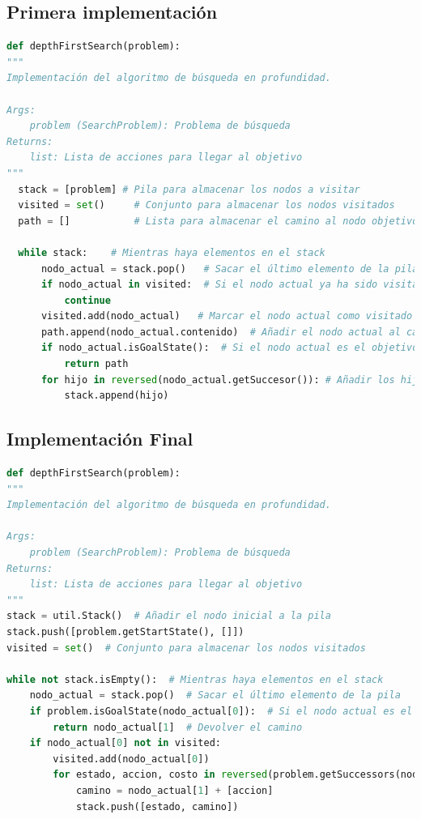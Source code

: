 \documentclass{report}
\begin{document}
        \subsection*{Primera implementación}
          \begin{lstlisting}[language=Python, caption=Implementación final del DFS]
def depthFirstSearch(problem):
"""
Implementación del algoritmo de búsqueda en profundidad.

Args:
    problem (SearchProblem): Problema de búsqueda
Returns:
    list: Lista de acciones para llegar al objetivo
"""
  stack = [problem] # Pila para almacenar los nodos a visitar
  visited = set()     # Conjunto para almacenar los nodos visitados
  path = []           # Lista para almacenar el camino al nodo objetivo

  while stack:    # Mientras haya elementos en el stack
      nodo_actual = stack.pop()   # Sacar el último elemento de la pila
      if nodo_actual in visited:  # Si el nodo actual ya ha sido visitado
          continue
      visited.add(nodo_actual)   # Marcar el nodo actual como visitado
      path.append(nodo_actual.contenido)  # Añadir el nodo actual al camino
      if nodo_actual.isGoalState():  # Si el nodo actual es el objetivo
          return path
      for hijo in reversed(nodo_actual.getSuccesor()): # Añadir los hijos del nodo actual a la pila
          stack.append(hijo)
          \end{lstlisting}
        \clearpage\subsection*{Implementación Final}
          \begin{lstlisting}[language=Python, caption=Implementación final del DFS]
def depthFirstSearch(problem):
"""
Implementación del algoritmo de búsqueda en profundidad.

Args:
    problem (SearchProblem): Problema de búsqueda
Returns:
    list: Lista de acciones para llegar al objetivo
"""
stack = util.Stack()  # Añadir el nodo inicial a la pila
stack.push([problem.getStartState(), []])
visited = set()  # Conjunto para almacenar los nodos visitados

while not stack.isEmpty():  # Mientras haya elementos en el stack
    nodo_actual = stack.pop()  # Sacar el último elemento de la pila
    if problem.isGoalState(nodo_actual[0]):  # Si el nodo actual es el objetivo
        return nodo_actual[1]  # Devolver el camino
    if nodo_actual[0] not in visited:
        visited.add(nodo_actual[0])
        for estado, accion, costo in reversed(problem.getSuccessors(nodo_actual[0])): 
            camino = nodo_actual[1] + [accion]
            stack.push([estado, camino])
          \end{lstlisting}
\end{document}
